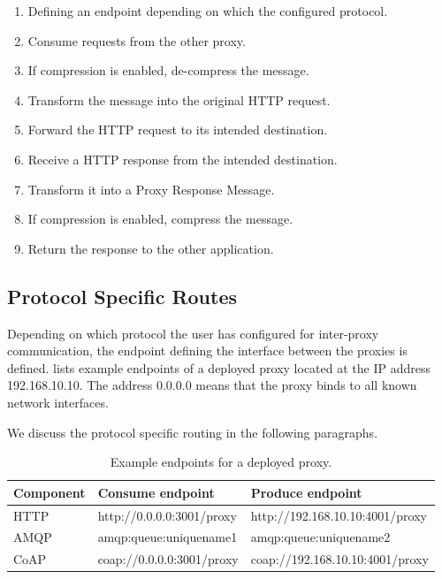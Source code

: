 \begin{enumerate}
	\item Defining an endpoint depending on which the configured protocol.
	\item Consume requests from the other proxy.
	\item If compression is enabled, de-compress the message.
	\item Transform the message into the original HTTP request.
	\item Forward the HTTP request to its intended destination.
	\item Receive a HTTP response from the intended destination.
	\item Transform it into a Proxy Response Message.
	\item If compression is enabled, compress the message.
	\item Return the response to the other application.
\end{enumerate}

\subsection{Protocol Specific Routes}
\label{section:protocol-routes}

Depending on which protocol the user has configured for inter-proxy
communication, the endpoint defining the interface between the proxies is
defined.  lists example endpoints of a deployed
proxy located at the IP address 192.168.10.10. The address 0.0.0.0 means that
the proxy binds to all known network interfaces.

 We discuss the protocol specific routing in the following paragraphs.

\begin{table}[h]
\begin{tabular}{|l|l|l|}
\hline
\textbf{Component} & \textbf{Consume endpoint} & \textbf{Produce endpoint}       \\ \hline
HTTP               & http://0.0.0.0:3001/proxy & http://192.168.10.10:4001/proxy \\ \hline
AMQP               & amqp:queue:uniquename1    & amqp:queue:uniquename2          \\ \hline
CoAP               & coap://0.0.0.0:3001/proxy & coap://192.168.10.10:4001/proxy \\ \hline
\end{tabular}
\caption{Example endpoints for a deployed proxy.}
\label{table:example-endpoints}
\end{table}


